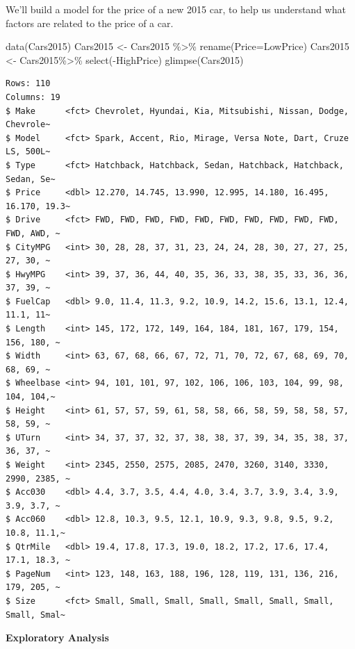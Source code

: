 \documentclass[
  letterpaper,
  DIV=11,
  numbers=noendperiod]{scrreprt}
\newenvironment{Shaded}{\begin{snugshade}}{\end{snugshade}}
\newcommand{\AttributeTok}[1]{\textcolor[rgb]{0.40,0.45,0.13}{#1}}
\newcommand{\FunctionTok}[1]{\textcolor[rgb]{0.28,0.35,0.67}{#1}}
\newcommand{\NormalTok}[1]{\textcolor[rgb]{0.00,0.23,0.31}{#1}}
\newcommand{\OtherTok}[1]{\textcolor[rgb]{0.00,0.23,0.31}{#1}}
\newcommand{\SpecialCharTok}[1]{\textcolor[rgb]{0.37,0.37,0.37}{#1}}
\begin{document}
We'll build a model for the price of a new 2015 car, to help us
understand what factors are related to the price of a car.

\begin{Shaded}
\begin{Highlighting}[]
\FunctionTok{data}\NormalTok{(Cars2015)}
\NormalTok{Cars2015 }\OtherTok{\textless{}{-}}\NormalTok{ Cars2015 }\SpecialCharTok{\%\textgreater{}\%} \FunctionTok{rename}\NormalTok{(}\AttributeTok{Price=}\NormalTok{LowPrice)}
\NormalTok{Cars2015 }\OtherTok{\textless{}{-}}\NormalTok{ Cars2015}\SpecialCharTok{\%\textgreater{}\%} \FunctionTok{select}\NormalTok{(}\SpecialCharTok{{-}}\NormalTok{HighPrice)}
\FunctionTok{glimpse}\NormalTok{(Cars2015)}
\end{Highlighting}
\end{Shaded}

\begin{verbatim}
Rows: 110
Columns: 19
$ Make      <fct> Chevrolet, Hyundai, Kia, Mitsubishi, Nissan, Dodge, Chevrole~
$ Model     <fct> Spark, Accent, Rio, Mirage, Versa Note, Dart, Cruze LS, 500L~
$ Type      <fct> Hatchback, Hatchback, Sedan, Hatchback, Hatchback, Sedan, Se~
$ Price     <dbl> 12.270, 14.745, 13.990, 12.995, 14.180, 16.495, 16.170, 19.3~
$ Drive     <fct> FWD, FWD, FWD, FWD, FWD, FWD, FWD, FWD, FWD, FWD, FWD, AWD, ~
$ CityMPG   <int> 30, 28, 28, 37, 31, 23, 24, 24, 28, 30, 27, 27, 25, 27, 30, ~
$ HwyMPG    <int> 39, 37, 36, 44, 40, 35, 36, 33, 38, 35, 33, 36, 36, 37, 39, ~
$ FuelCap   <dbl> 9.0, 11.4, 11.3, 9.2, 10.9, 14.2, 15.6, 13.1, 12.4, 11.1, 11~
$ Length    <int> 145, 172, 172, 149, 164, 184, 181, 167, 179, 154, 156, 180, ~
$ Width     <int> 63, 67, 68, 66, 67, 72, 71, 70, 72, 67, 68, 69, 70, 68, 69, ~
$ Wheelbase <int> 94, 101, 101, 97, 102, 106, 106, 103, 104, 99, 98, 104, 104,~
$ Height    <int> 61, 57, 57, 59, 61, 58, 58, 66, 58, 59, 58, 58, 57, 58, 59, ~
$ UTurn     <int> 34, 37, 37, 32, 37, 38, 38, 37, 39, 34, 35, 38, 37, 36, 37, ~
$ Weight    <int> 2345, 2550, 2575, 2085, 2470, 3260, 3140, 3330, 2990, 2385, ~
$ Acc030    <dbl> 4.4, 3.7, 3.5, 4.4, 4.0, 3.4, 3.7, 3.9, 3.4, 3.9, 3.9, 3.7, ~
$ Acc060    <dbl> 12.8, 10.3, 9.5, 12.1, 10.9, 9.3, 9.8, 9.5, 9.2, 10.8, 11.1,~
$ QtrMile   <dbl> 19.4, 17.8, 17.3, 19.0, 18.2, 17.2, 17.6, 17.4, 17.1, 18.3, ~
$ PageNum   <int> 123, 148, 163, 188, 196, 128, 119, 131, 136, 216, 179, 205, ~
$ Size      <fct> Small, Small, Small, Small, Small, Small, Small, Small, Smal~
\end{verbatim}

\textbf{Exploratory Analysis}
\end{document}
